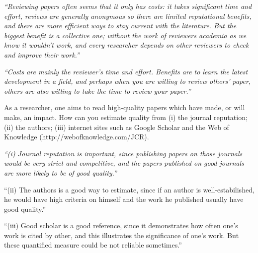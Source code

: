 \documentclass[portrait,11pt]{seminar}
\begin{document}
{\it ``Reviewing papers often seems that it only has costs: it takes significant time and effort, reviews are generally anonymous so there are limited reputational benefits, and there are more efficient ways to stay current with the literature. But the biggest benefit is a collective one; without the work of reviewers academia as we know it wouldn't work, and every researcher depends on other reviewers to check and improve their work.''}




\es {}

\it
``Costs are mainly the reviewer's time and effort. Benefits are to learn the latest development in a field, and perhaps when you are willing to review others' paper, others are also willing to take the time to review your paper.''


\es \bs As a researcher, one aims to read high-quality papers which have made, or will make, an impact. How can you estimate quality from (i) the journal reputation; (ii) the authors; (iii) internet sites such as Google Scholar and the Web of Knowledge ({http://webofknowledge.com/JCR}).

{\it ``(i) Journal reputation is important, since publishing papers on those journals would
be very strict and competitive, and the papers published on good journals are more
likely to be of good quality.''

``(ii) The authors is a good way to estimate, since if an author is well-estabilished,
he would have high criteria on himself and the work he published usually have good
quality.''

``(iii) Good scholar is a good reference, since it demonstrates how often one’s work is
cited by other, and this illustrates the significance of one’s work. But these quantified
measure could be not reliable sometimes.''
}



%
%
\end{document}
